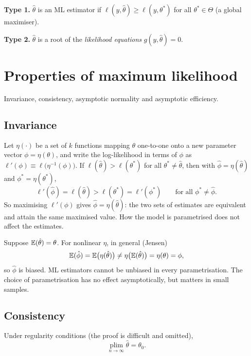 \documentclass[11pt]{article}
\begin{document}
\begin{flatlist}
 \item[] \textbf{Type 1.} $\hat\theta$ is an ML estimator if
         $\ell(y,\hat\theta)\ge\ell(y,\theta^{*})$ for all $\theta^{*}\in\Theta$ (a global maximiser).
 \item[] \textbf{Type 2.} $\hat\theta$ is a root of the \emph{likelihood equations}
         $g(y,\hat\theta)=0$.
\end{flatlist}

\section{Properties of maximum likelihood}

Invariance, consistency, asymptotic normality and asymptotic efficiency.

\subsection{Invariance}

Let $\eta(\cdot)$ be a set of $k$ functions mapping $\theta$ one-to-one onto a new parameter
vector $\phi=\eta(\theta)$, and write the log-likelihood in terms of $\phi$ as
$\ell'(\phi)\equiv\ell\bigl(\eta^{-1}(\phi)\bigr)$. If $\ell(\hat\theta)>\ell(\theta^{*})$ for all
$\theta^{*}\neq\hat\theta$, then with $\hat\phi=\eta(\hat\theta)$ and $\phi^{*}=\eta(\theta^{*})$,
\[ \ell'(\hat\phi)=\ell(\hat\theta)>\ell(\theta^{*})=\ell'(\phi^{*})
   \qquad\text{for all }\phi^{*}\neq\hat\phi . \]
So maximising $\ell'(\phi)$ gives $\hat\phi=\eta(\hat\theta)$: the two sets of estimates are
equivalent and attain the same maximised value. How the model is parametrised does not
affect the estimates.

Suppose $\mathbb{E}(\hat\theta)=\theta$. For nonlinear $\eta$, in general (Jensen)
\[ \mathbb{E}(\hat\phi)=\mathbb{E}\bigl(\eta(\hat\theta)\bigr)\neq\eta\bigl(\mathbb{E}(\hat\theta)\bigr)=\eta(\theta)=\phi, \]
so $\hat\phi$ is biased. ML estimators cannot be unbiased in every parametrisation.
The choice of parametrisation has no effect asymptotically, but matters in small samples.

\subsection{Consistency}

Under regularity conditions (the proof is difficult and omitted),
\[ \operatorname*{plim}_{n\to\infty}\hat\theta=\theta_{0}. \]
\end{document}
